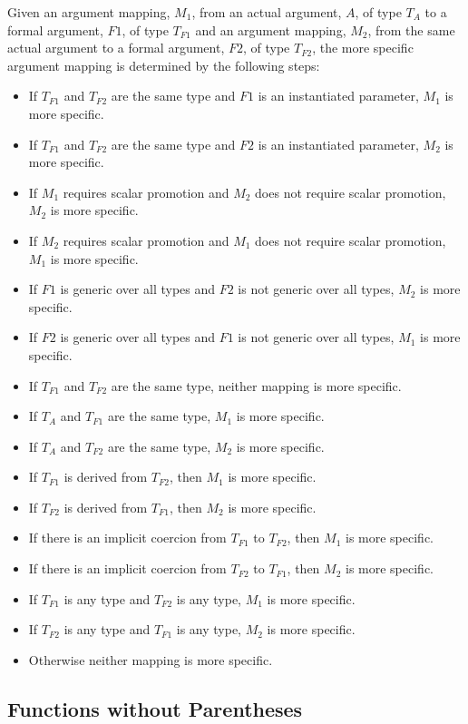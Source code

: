Given an argument mapping, $M_1$, from an actual argument, $A$, of
type $T_A$ to a formal argument, $F1$, of type $T_{F1}$ and an
argument mapping, $M_2$, from the same actual argument to a formal
argument, $F2$, of type $T_{F2}$, the more specific argument mapping
is determined by the following steps:
\begin{itemize}
\item
 If $T_{F1}$ and $T_{F2}$ are the same type and $F1$ is an
 instantiated parameter, $M_1$ is more specific.
\item
 If $T_{F1}$ and $T_{F2}$ are the same type and $F2$ is an
 instantiated parameter, $M_2$ is more specific.
\item
 If $M_1$ requires scalar promotion and $M_2$ does not require scalar
 promotion, $M_2$ is more specific.
\item
 If $M_2$ requires scalar promotion and $M_1$ does not require scalar
 promotion, $M_1$ is more specific.
\item
 If $F1$ is generic over all types and $F2$ is not generic over all
 types, $M_2$ is more specific.
\item
 If $F2$ is generic over all types and $F1$ is not generic over all
 types, $M_1$ is more specific.
\item
 If $T_{F1}$ and $T_{F2}$ are the same type, neither mapping is more
 specific.
\item
 If $T_A$ and $T_{F1}$ are the same type, $M_1$ is more specific.
\item
 If $T_A$ and $T_{F2}$ are the same type, $M_2$ is more specific.
\item
 If $T_{F1}$ is derived from $T_{F2}$, then $M_1$ is more specific.
\item
 If $T_{F2}$ is derived from $T_{F1}$, then $M_2$ is more specific.
\item
 If there is an implicit coercion from $T_{F1}$ to $T_{F2}$, then
 $M_1$ is more specific.
\item
 If there is an implicit coercion from $T_{F2}$ to $T_{F1}$, then
 $M_2$ is more specific.
\item
 If $T_{F1}$ is any  type and $T_{F2}$ is any 
 type, $M_1$ is more specific.
\item
 If $T_{F2}$ is any  type and $T_{F1}$ is any 
 type, $M_2$ is more specific.
\item
 Otherwise neither mapping is more specific.
\end{itemize}

\subsection{Functions without Parentheses}
\label{Functions_without_Parentheses}

